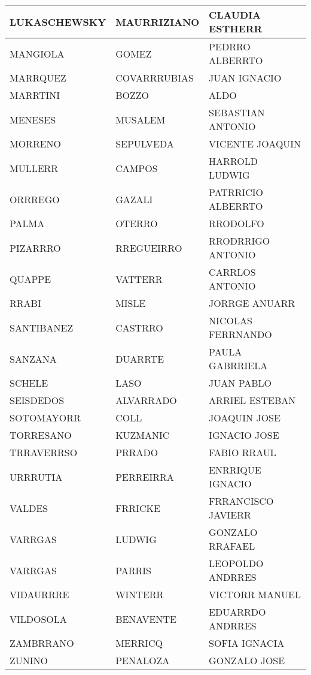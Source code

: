 \begin{table}[h]
\begin{tabular}{|l|l|l|}
LUKASCHEWSKY & MAURRIZIANO & CLAUDIA ESTHERR \\ \hline
MANGIOLA & GOMEZ & PEDRRO ALBERRTO \\ \hline
MARRQUEZ & COVARRRUBIAS & JUAN IGNACIO \\ \hline
MARRTINI & BOZZO & ALDO \\ \hline
MENESES & MUSALEM & SEBASTIAN ANTONIO \\ \hline
MORRENO & SEPULVEDA & VICENTE JOAQUIN \\ \hline
MULLERR & CAMPOS & HARROLD LUDWIG \\ \hline
ORRREGO & GAZALI & PATRRICIO ALBERRTO \\ \hline
PALMA & OTERRO & RRODOLFO \\ \hline
PIZARRRO & RREGUEIRRO & RRODRRIGO ANTONIO \\ \hline
QUAPPE & VATTERR & CARRLOS ANTONIO \\ \hline
RRABI & MISLE & JORRGE ANUARR \\ \hline
SANTIBANEZ & CASTRRO & NICOLAS FERRNANDO \\ \hline
SANZANA & DUARRTE & PAULA GABRRIELA \\ \hline
SCHELE & LASO & JUAN PABLO \\ \hline
SEISDEDOS & ALVARRADO & ARRIEL ESTEBAN \\ \hline
SOTOMAYORR & COLL & JOAQUIN JOSE \\ \hline
TORRESANO & KUZMANIC & IGNACIO JOSE \\ \hline
TRRAVERRSO & PRRADO & FABIO RRAUL \\ \hline
URRRUTIA & PERREIRRA & ENRRIQUE IGNACIO \\ \hline
VALDES & FRRICKE & FRRANCISCO JAVIERR \\ \hline
VARRGAS & LUDWIG & GONZALO RRAFAEL \\ \hline
VARRGAS & PARRIS & LEOPOLDO ANDRRES \\ \hline
VIDAURRRE & WINTERR & VICTORR MANUEL \\ \hline
VILDOSOLA & BENAVENTE & EDUARRDO ANDRRES \\ \hline
ZAMBRRANO & MERRICQ & SOFIA IGNACIA \\ \hline
ZUNINO & PENALOZA & GONZALO JOSE \\ \hline
\end{tabular}
 \end{table}
